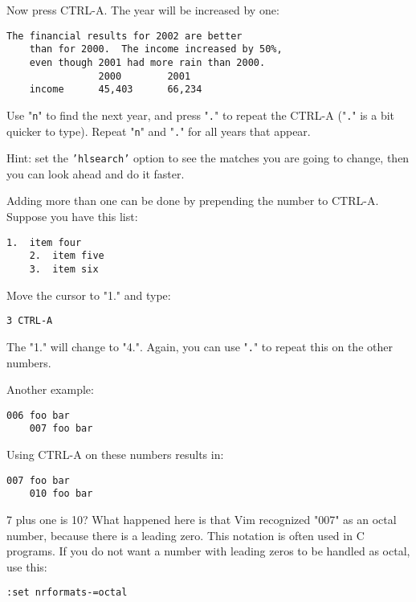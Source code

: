 Now press CTRL-A.
The year will be increased by one:

\begin{Verbatim}[samepage=true]
    The financial results for 2002 are better 
    than for 2000.  The income increased by 50%, 
    even though 2001 had more rain than 2000. 
                2000        2001 
    income      45,403      66,234 
\end{Verbatim}

Use "\texttt{n}" to find the next year, and press "\texttt{.}" to repeat the CTRL-A ("\texttt{.}" is a bit quicker to type).
Repeat "\texttt{n}" and "\texttt{.}" for all years that appear.

Hint: set the \texttt{'hlsearch'} option to see the matches you are going to change, then you can look ahead and do it faster.

Adding more than one can be done by prepending the number to CTRL-A.
Suppose you have this list:

\begin{Verbatim}[samepage=true]
    1.  item four 
    2.  item five 
    3.  item six 
\end{Verbatim}

Move the cursor to "1." and type:

\begin{Verbatim}[samepage=true]
 3 CTRL-A
\end{Verbatim}

The "1." will change to "4.".
Again, you can use "\texttt{.}" to repeat this on the other numbers.

Another example:

\begin{Verbatim}[samepage=true]
    006 foo bar 
    007 foo bar 
\end{Verbatim}

Using CTRL-A on these numbers results in:

\begin{Verbatim}[samepage=true]
    007 foo bar 
    010 foo bar 
\end{Verbatim}

7 plus one is 10?  What happened here is that Vim recognized "007" as an octal number, because there is a leading zero.
This notation is often used in C programs.
If you do not want a number with leading zeros to be handled as octal, use this:

\begin{Verbatim}[samepage=true]
 :set nrformats-=octal
\end{Verbatim}

